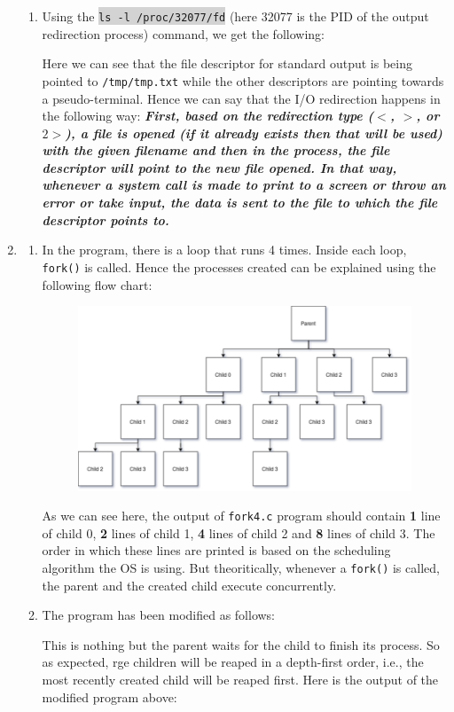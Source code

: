 \documentclass[a4paper]{article}
\newcommand{\command}[1]{\colorbox{lightgray}{\texttt{#1}}}
\begin{document}
\begin{enumerate}
\begin{enumerate}
		
		\item Using the \command{ls -l /proc/32077/fd} (here 32077 is the PID of the output redirection process) command, we get the following:
		
		Here we can see that the file descriptor for standard output is being pointed to \texttt{/tmp/tmp.txt} while the other descriptors are pointing towards a pseudo-terminal. Hence we can say that the I/O redirection happens in the following way: \textbf{\textit{First, based on the redirection type ($<$, $>$, or $2>$), a file is opened (if it already exists then that will be used) with the given filename and then in the process, the file descriptor will point to the new file opened. In that way, whenever a system call is made to print to a screen or throw an error or take input, the data is sent to the file to which the file descriptor points to.}}
	\end{enumerate}
	\item 
		\begin{enumerate}
			\item In the program, there is a loop that runs 4 times. Inside each loop, \texttt{fork()} is called. Hence the processes created can be explained using the following flow chart:
			\begin{figure}[ht]
				\centering
				\includegraphics[scale=0.4]{flowchart.png}
			\end{figure}
		
			As we can see here, the output of \texttt{fork4.c} program should contain \textbf{1} line of child 0, \textbf{2} lines of child 1, \textbf{4} lines of child 2 and \textbf{8} lines of child 3. The order in which these lines are printed is based on the scheduling algorithm the OS is using. But theoritically, whenever a \texttt{fork()} is called, the parent and the created child execute concurrently. 
			\item The program has been modified as follows:
			 
			 This is nothing but the parent waits for the child to finish its process. So as expected, rge children will be reaped in a depth-first order, i.e., the most recently created child will be reaped first. Here is the output of the modified program above:
			 
		\end{enumerate}
\end{enumerate}
\end{document}
